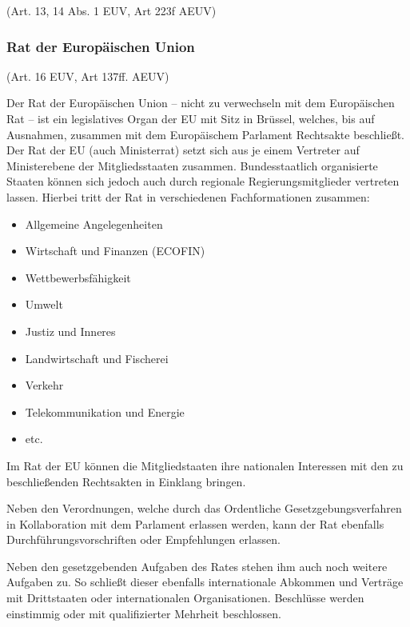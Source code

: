 \begin{center}
    {\footnotesize(Art. 13, 14 Abs. 1 EUV, Art 223f AEUV)}
\end{center}

\noindent


\subsubsection{Rat der Europäischen Union}

\begin{center}
    {\footnotesize(Art. 16 EUV, Art 137ff. AEUV)}
\end{center}

\noindent
Der Rat der Europäischen Union – nicht zu verwechseln mit dem Europäischen Rat – ist ein legislatives Organ der EU mit Sitz in Brüssel, welches, bis auf Ausnahmen, zusammen mit dem Europäischem Parlament Rechtsakte beschließt.
Der Rat der EU (auch Ministerrat) setzt sich aus je einem Vertreter auf Ministerebene der Mitgliedsstaaten zusammen. Bundesstaatlich organisierte Staaten können sich jedoch auch durch regionale Regierungsmitglieder vertreten lassen. Hierbei tritt der Rat in verschiedenen Fachformationen zusammen:

\begin{itemize}
    \item Allgemeine Angelegenheiten
    \item Wirtschaft und Finanzen (ECOFIN)
    \item Wettbewerbsfähigkeit
    \item Umwelt
    \item Justiz und Inneres
    \item Landwirtschaft und Fischerei
    \item Verkehr
    \item Telekommunikation und Energie
    \item etc.
\end{itemize}

Im Rat der EU können die Mitgliedstaaten ihre nationalen Interessen mit den zu beschließenden Rechtsakten in Einklang bringen.

Neben den Verordnungen, welche durch das Ordentliche Gesetzgebungsverfahren in Kollaboration mit dem Parlament erlassen werden, kann der Rat ebenfalls Durchführungsvorschriften oder Empfehlungen erlassen.

Neben den gesetzgebenden Aufgaben des Rates stehen ihm auch noch weitere Aufgaben zu. So schließt dieser ebenfalls internationale Abkommen und Verträge mit Drittstaaten oder internationalen Organisationen. 
Beschlüsse werden einstimmig oder mit qualifizierter Mehrheit beschlossen.


